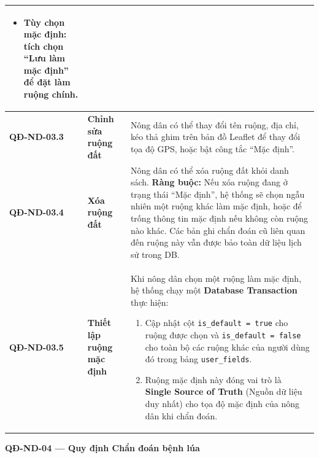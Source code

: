 \documentclass[12pt,a4paper]{article}
\begin{document}
\begin{longtable}{|
        >{\raggedright\arraybackslash}p{2.2cm}|
        >{\raggedright\arraybackslash}p{2.8cm}|
        >{\raggedright\arraybackslash}p{9.8cm}|}
\begin{itemize}[leftmargin=*,topsep=2pt,itemsep=1pt]
        \item \textbf{Tùy chọn mặc định:} tích chọn ``Lưu làm mặc định'' để đặt làm ruộng chính.
    \end{itemize}                                                     \\
    \hline
    \textbf{QĐ-ND-03.3}  & \textbf{Chỉnh sửa ruộng đất}      &
    Nông dân có thể thay đổi tên ruộng, địa chỉ, kéo thả ghim trên bản đồ Leaflet để thay đổi tọa độ GPS, hoặc bật công tắc ``Mặc định''.                                                                                                                                                              \\
    \hline
    \textbf{QĐ-ND-03.4}  & \textbf{Xóa ruộng đất}            &
    Nông dân có thể xóa ruộng đất khỏi danh sách. \newline
    \textbf{Ràng buộc:} Nếu xóa ruộng đang ở trạng thái ``Mặc định'', hệ thống sẽ chọn ngẫu nhiên một ruộng khác làm mặc định, hoặc để trống thông tin mặc định nếu không còn ruộng nào khác. Các bản ghi chẩn đoán cũ liên quan đến ruộng này vẫn được bảo toàn dữ liệu lịch sử trong DB.             \\
    \hline
    \textbf{QĐ-ND-03.5}  & \textbf{Thiết lập ruộng mặc định} &
    Khi nông dân chọn một ruộng làm mặc định, hệ thống chạy một \textbf{Database Transaction} thực hiện:
    \begin{enumerate}[leftmargin=*,topsep=2pt,itemsep=1pt]
        \item Cập nhật cột \texttt{is\_default = true} cho ruộng được chọn và \texttt{is\_default = false} cho toàn bộ các ruộng khác của người dùng đó trong bảng \texttt{user\_fields}.
        \item Ruộng mặc định này đóng vai trò là \textbf{Single Source of Truth} (Nguồn dữ liệu duy nhất) cho tọa độ mặc định của nông dân khi chẩn đoán.
    \end{enumerate}                                                                                                               \\
    \hline
\end{longtable}

\vspace{0.3cm}
\noindent\textbf{QĐ-ND-04 --- Quy định Chẩn đoán bệnh lúa}
\end{document}
